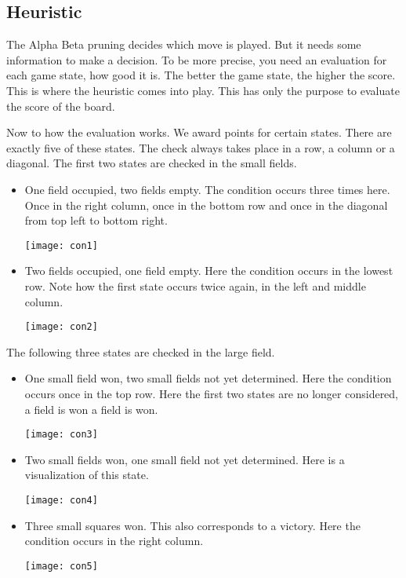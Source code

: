 \subsection{Heuristic}
The Alpha Beta pruning decides which move is played. But it needs some information to make a decision. To be more precise, you need an evaluation for each game state, how good it is. The better the game state, the higher the score. This is where the heuristic comes into play. This has only the purpose to evaluate the score of the board.

Now to how the evaluation works. We award points for certain states. There are exactly five of these states.
The check always takes place in a row, a column or a diagonal. The first two states are checked in the small fields.
\begin{itemize}
\item One field occupied, two fields empty. The condition occurs three times here. Once in the right column, once in the bottom row and once in the diagonal from top left to bottom right.
\begin{fixedpic}
	\texttt{[image: con1]}
\end{fixedpic}
\item Two fields occupied, one field empty. Here the condition occurs in the lowest row. Note how the first state occurs twice again, in the left and middle column.
\begin{fixedpic}
	\texttt{[image: con2]}
\end{fixedpic}
\end{itemize}
The following three states are checked in the large field.
\begin{itemize}
\item One small field won, two small fields not yet determined. Here the condition occurs once in the top row. Here the first two states are no longer considered, a field is won a field is won.
\begin{fixedpic}
	\texttt{[image: con3]}
\end{fixedpic}
\item Two small fields won, one small field not yet determined. Here is a visualization of this state.
\begin{fixedpic}
	\centering
	\texttt{[image: con4]}
\end{fixedpic}
\item Three small squares won. This also corresponds to a victory. Here the condition occurs in the right column.
\begin{fixedpic}
	\centering
	\texttt{[image: con5]}
\end{fixedpic}
\end{itemize}
